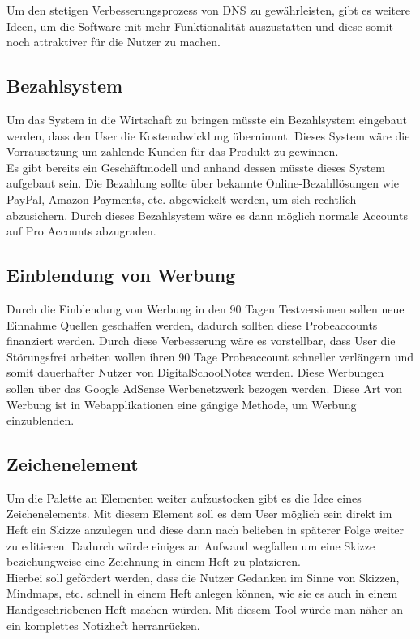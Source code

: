 Um den stetigen Verbesserungsprozess von DNS zu gewährleisten, gibt es weitere Ideen, um die Software mit mehr Funktionalität auszustatten und diese somit noch attraktiver für die Nutzer zu machen. 
\subsection{Bezahlsystem}
Um das System in die Wirtschaft zu bringen müsste ein Bezahlsystem eingebaut werden, dass den User die Kostenabwicklung übernimmt. Dieses System wäre die Vorrausetzung um zahlende Kunden für das Produkt zu gewinnen.\\
Es gibt bereits ein Geschäftmodell und anhand dessen müsste dieses System aufgebaut sein. Die Bezahlung sollte über bekannte Online-Bezahllösungen wie PayPal, Amazon Payments, etc. abgewickelt werden, um sich rechtlich abzusichern. Durch dieses Bezahlsystem wäre es dann möglich normale Accounts auf Pro Accounts abzugraden. 
\subsection{Einblendung von Werbung}
Durch die Einblendung von Werbung in den 90 Tagen Testversionen sollen neue Einnahme Quellen geschaffen werden, dadurch sollten diese Probeaccounts finanziert werden. Durch diese Verbesserung wäre es vorstellbar, dass User die Störungsfrei arbeiten wollen ihren 90 Tage Probeaccount schneller verlängern und somit dauerhafter Nutzer von DigitalSchoolNotes werden. Diese Werbungen sollen über das Google AdSense Werbenetzwerk bezogen werden. Diese Art von Werbung ist in Webapplikationen eine gängige Methode, um Werbung einzublenden.
\subsection{Zeichenelement}
Um die Palette an Elementen weiter aufzustocken gibt es die Idee eines Zeichenelements. Mit diesem Element soll es dem User möglich sein direkt im Heft ein Skizze anzulegen und diese dann nach belieben in späterer Folge weiter zu editieren. Dadurch würde einiges an Aufwand wegfallen um eine Skizze beziehungweise eine Zeichnung in einem Heft zu platzieren.\\
Hierbei soll gefördert werden, dass die Nutzer Gedanken im Sinne von Skizzen, Mindmaps, etc. schnell in einem Heft anlegen können, wie sie es auch in einem Handgeschriebenen Heft machen würden. Mit diesem Tool würde man näher an ein komplettes Notizheft herranrücken. 
